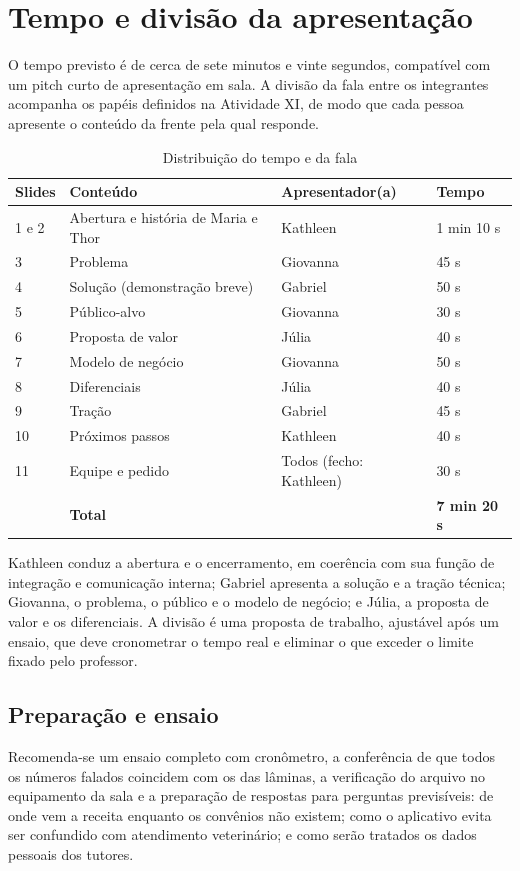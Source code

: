 \section{Tempo e divisão da apresentação}
\label{sec:apresentacao}

O tempo previsto é de cerca de sete minutos e vinte segundos, compatível com um pitch curto de apresentação em sala. A divisão da fala entre os integrantes acompanha os papéis definidos na Atividade XI, de modo que cada pessoa apresente o conteúdo da frente pela qual responde.

\begin{table}[htb]
\centering
\caption{Distribuição do tempo e da fala}
\label{tab:tempo}
\begin{tabularx}{\textwidth}{L{1.6cm} Y L{3.6cm} L{1.8cm}}
\toprule
\textbf{Slides} & \textbf{Conteúdo} & \textbf{Apresentador(a)} & \textbf{Tempo}\\
 e 2 & Abertura e história de Maria e Thor & Kathleen & 1 min 10 s\\
3 & Problema & Giovanna & 45 s\\
4 & Solução (demonstração breve) & Gabriel & 50 s\\
5 & Público-alvo & Giovanna & 30 s\\
6 & Proposta de valor & Júlia & 40 s\\
7 & Modelo de negócio & Giovanna & 50 s\\
8 & Diferenciais & Júlia & 40 s\\
9 & Tração & Gabriel & 45 s\\
10 & Próximos passos & Kathleen & 40 s\\
11 & Equipe e pedido & Todos (fecho: Kathleen) & 30 s\\
\midrule
 & \textbf{Total} & & \textbf{7 min 20 s}\\
\bottomrule
\end{tabularx}
\fonteautores
\end{table}

Kathleen conduz a abertura e o encerramento, em coerência com sua função de integração e comunicação interna; Gabriel apresenta a solução e a tração técnica; Giovanna, o problema, o público e o modelo de negócio; e Júlia, a proposta de valor e os diferenciais. A divisão é uma proposta de trabalho, ajustável após um ensaio, que deve cronometrar o tempo real e eliminar o que exceder o limite fixado pelo professor.

\subsection{Preparação e ensaio}

Recomenda-se um ensaio completo com cronômetro, a conferência de que todos os números falados coincidem com os das lâminas, a verificação do arquivo no equipamento da sala e a preparação de respostas para perguntas previsíveis: de onde vem a receita enquanto os convênios não existem; como o aplicativo evita ser confundido com atendimento veterinário; e como serão tratados os dados pessoais dos tutores.
